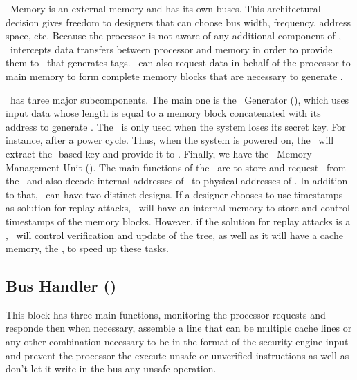 \ptag~Memory is an external memory and has its own buses. This architectural decision gives freedom to designers that can choose bus width, frequency, address space, etc. Because the processor is not aware of any additional component of \cshia, \handler~intercepts data transfers between processor and memory in order to provide them to \seceng~that generates tags. \handler~can also request data in behalf of the processor to main memory to form complete memory blocks that are necessary to generate \ptags.

\seceng~has three major subcomponents. The main one is the \ptag~Generator (\ptaggen), which uses input data whose length is equal to a memory block concatenated with its address to generate \ptags. The \fuzzy~is only used when the system loses its secret key. For instance, after a power cycle. Thus, when the system is powered on, the \fuzzy~will extract the \puf-based key and provide it to \ptaggen. Finally, we have the \ptag~Memory Management Unit (\pmmu). The main functions of the \pmmu~are to store and request \ptags~from the \ptagmem~and also decode internal addresses of \ptags~to physical addresses of \ptagmem. In addition to that, \pmmu~can have two distinct designs. If a designer chooses to use timestamps as solution for replay attacks, \pmmu~will have an internal memory to store and control timestamps of the memory blocks. However, if the solution for replay attacks is a \mt, \pmmu~will control verification and update of the tree, as well as it will have a cache memory, the \ptagcache, to speed up these tasks.






\subsection{Bus Handler (\handler)}
This block has three main functions, monitoring the processor requests and responde then when necessary, 
assemble a line that can be multiple cache lines or any other combination necessary to be in the format
 of the security engine input  and prevent the processor the execute unsafe or unverified instructions
 as well as don't let  it  write in the bus any unsafe operation.
